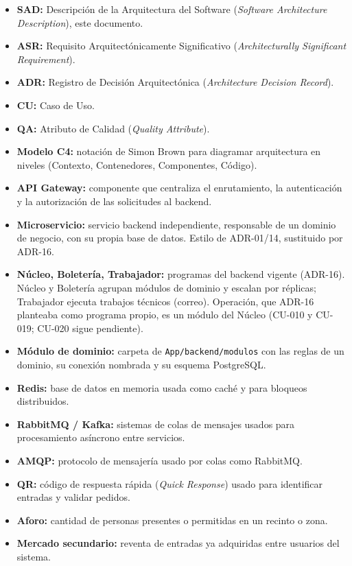 \documentclass[11pt,a4paper]{article}
\begin{document}
\begin{itemize}
\item \textbf{SAD:} Descripción de la Arquitectura del Software (\textit{Software Architecture
Description}), este documento.
\item \textbf{ASR:} Requisito Arquitectónicamente Significativo (\textit{Architecturally
Significant Requirement}).
\item \textbf{ADR:} Registro de Decisión Arquitectónica (\textit{Architecture Decision Record}).
\item \textbf{CU:} Caso de Uso.
\item \textbf{QA:} Atributo de Calidad (\textit{Quality Attribute}).
\item \textbf{Modelo C4:} notación de Simon Brown para diagramar arquitectura en niveles
(Contexto, Contenedores, Componentes, Código).
\item \textbf{API Gateway:} componente que centraliza el enrutamiento, la autenticación y la
autorización de las solicitudes al backend.
\item \textbf{Microservicio:} servicio backend independiente, responsable de un dominio de
negocio, con su propia base de datos. Estilo de ADR-01/14, sustituido por ADR-16.
\item \textbf{Núcleo, Boletería, Trabajador:} programas del backend vigente (ADR-16).
Núcleo y Boletería agrupan módulos de dominio y escalan por réplicas; Trabajador ejecuta trabajos
técnicos (correo). Operación, que ADR-16 planteaba como programa propio, es un módulo del Núcleo
(CU-010 y CU-019; CU-020 sigue pendiente).
\item \textbf{Módulo de dominio:} carpeta de \texttt{App/backend/modulos} con las reglas de un
dominio, su conexión nombrada y su esquema PostgreSQL.
\item \textbf{Redis:} base de datos en memoria usada como caché y para bloqueos distribuidos.
\item \textbf{RabbitMQ / Kafka:} sistemas de colas de mensajes usados para procesamiento
asíncrono entre servicios.
\item \textbf{AMQP:} protocolo de mensajería usado por colas como RabbitMQ.
\item \textbf{QR:} código de respuesta rápida (\textit{Quick Response}) usado para identificar
entradas y validar pedidos.
\item \textbf{Aforo:} cantidad de personas presentes o permitidas en un recinto o zona.
\item \textbf{Mercado secundario:} reventa de entradas ya adquiridas entre usuarios del sistema.

\end{itemize}
\end{document}

